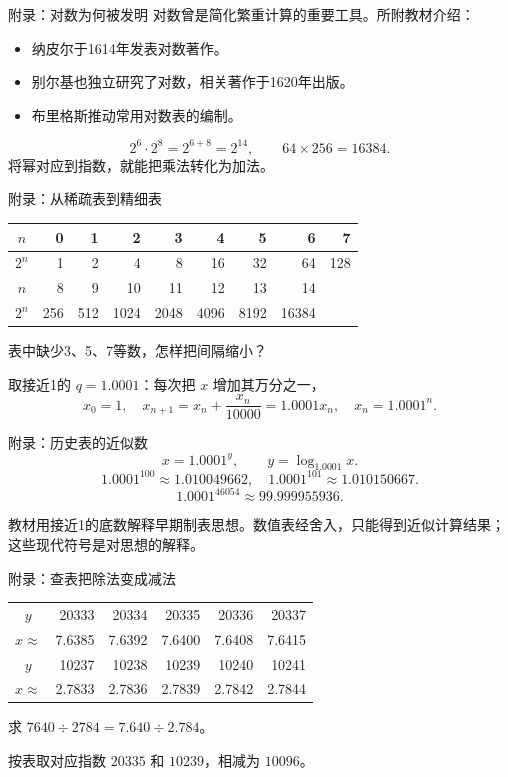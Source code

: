 \begin{frame}[t]{附录：对数为何被发明}
对数曾是简化繁重计算的重要工具。所附教材介绍：
\begin{itemize}
\item 纳皮尔于1614年发表对数著作。
\item 别尔基也独立研究了对数，相关著作于1620年出版。
\item 布里格斯推动常用对数表的编制。
\end{itemize}
\[2^6\cdot2^8=2^{6+8}=2^{14},\qquad64\times256=16384.\]
将幂对应到指数，就能把乘法转化为加法。\end{frame}

\begin{frame}[t]{附录：从稀疏表到精细表}
\small
\centering\begin{tabular}{c|rrrrrrrr}
$n$&0&1&2&3&4&5&6&7\\\hline
$2^n$&1&2&4&8&16&32&64&128\\\hline
$n$&8&9&10&11&12&13&14&\\\hline
$2^n$&256&512&1024&2048&4096&8192&16384&
\end{tabular}\par\normalsize
表中缺少3、5、7等数，怎样把间隔缩小？

取接近1的 $q=1.0001$：每次把 $x$ 增加其万分之一，
\[x_0=1,\quad x_{n+1}=x_n+\frac{x_n}{10000}=1.0001x_n,\quad x_n=1.0001^n.\]\end{frame}

\begin{frame}[t]{附录：历史表的近似数}
\[x=1.0001^y,\qquad y=\log_{1.0001}x.\]
\[1.0001^{100}\approx1.010049662,\quad
1.0001^{101}\approx1.010150667.\]
\[1.0001^{46054}\approx99.999955936.\]

教材用接近1的底数解释早期制表思想。数值表经舍入，只能得到近似计算结果；这些现代符号是对思想的解释。\end{frame}

\begin{frame}[t]{附录：查表把除法变成减法}
\small\centering\renewcommand{\arraystretch}{1.35}
\begin{tabular}{c|rrrrr}
$y$&20333&20334&20335&20336&20337\\
$x\approx$&7.6385&7.6392&7.6400&7.6408&7.6415\\\hline
$y$&10237&10238&10239&10240&10241\\
$x\approx$&2.7833&2.7836&2.7839&2.7842&2.7844
\end{tabular}\par\normalsize
求 $7640\div2784=7.640\div2.784$。

按表取对应指数 $20335$ 和 $10239$，相减为 $10096$。\end{frame}

